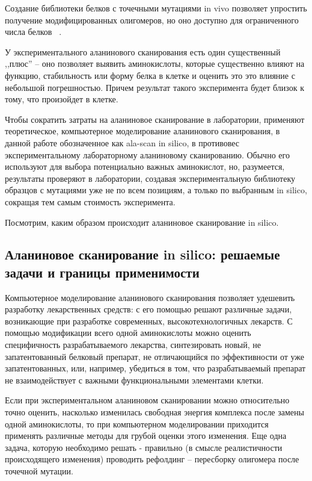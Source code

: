 Создание библиотеки белков с точечными мутациями in vivo позволяет упростить получение модифицированных олигомеров, но оно доступно для ограниченного числа белков ~\cite{alascan2001}.

У экспериментального аланинового  сканирования есть один существенный ,,плюс'' -- оно позволяет выявить  аминокислоты, которые существенно влияют на функцию, стабильность или форму белка в клетке и оценить это это влияние с небольшой погрешностью. Причем результат такого эксперимента будет близок к тому, что произойдет в клетке. 

Чтобы сократить затраты на аланиновое сканирование в лаборатории, применяют теоретическое, компьютерное моделирование аланинового сканирования, в данной работе обозначенное как ala-scan in silico, в противовес экспериментальному лабораторному аланиновому сканированию. Обычно его используют для выбора потенциально важных аминокислот, но, разумеется, результаты проверяют в лаборатории, создавая экспериментальную библиотеку образцов с мутациями уже не по всем позициям, а только по выбранным in silico, сокращая тем самым стоимость эксперимента.

Посмотрим, каким образом происходит аланиновое сканирование in silico.

\subsection{Аланиновое сканирование in silico: решаемые задачи и границы применимости}

Компьютерное моделирование аланинового сканирования позволяет удешевить разработку лекарственных средств: с его помощью решают различные задачи, возникающие при разработке современных, высокотехнологичных лекарств. С помощью модификации всего одной аминокислоты можно оценить специфичность разрабатываемого лекарства, синтезировать новый, не запатентованный белковый препарат, не отличающийся по эффективности от уже запатентованных, или, например, убедиться в том, что разрабатываемый препарат не взаимодействует с важными функциональными элементами клетки. 


Если при экспериментальном аланиновом сканировании можно относительно точно оценить, насколько изменилась свободная энергия комплекса после замены одной аминокислоты, то при компьютерном моделировании приходится применять различные методы для грубой оценки этого изменения. Еще одна задача, которую необходимо решать - правильно (в смысле реалистичности происходящего изменения) проводить рефолдинг -- пересборку олигомера после точечной мутации.

